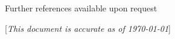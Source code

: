 \documentclass[a4paper,10pt,oneside]{article}
\newcommand{\CVNote}{This document is accurate as of {\today}}
\begin{document}
\begin{body}
\EntryGap

\par Further references available upon request





\end{body}


\begin{flushright}
\scriptsize%
[\textit{\CVNote}]%
\hspace{2.0mm}\null
\end{flushright}

\label{LastPage}~
\end{document}
